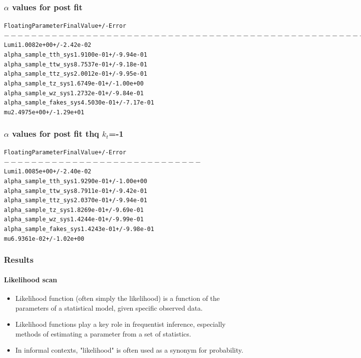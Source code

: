 \documentclass[11pt]{beamer}
\begin{document}
\begin{frame}
\frametitle{$\alpha$ values for post fit}
\begin{alltt}
Floating Parameter		\qquad		FinalValue +/- Error \\
$-----------------------------------------------------------------------$			
Lumi \quad	\qquad	\qquad		\qquad	\qquad	1.0082e+00 +/-  2.42e-02\\
alpha\_sample\_tth\_sys	\quad	1.9100e-01 +/-  9.94e-01\\
alpha\_sample\_ttw\_sys	\quad	8.7537e-01 +/-  9.18e-01\\
alpha\_sample\_ttz\_sys	\quad	2.0012e-01 +/-  9.95e-01\\
alpha\_sample\_tz\_sys\qquad	1.6749e-01 +/-  1.00e+00\\
alpha\_sample\_wz\_sys\qquad	 1.2732e-01 +/-  9.84e-01 \\
alpha\_sample\_fakes\_sys	4.5030e-01 +/-  7.17e-01\\
mu 	\qquad	\qquad	\qquad	\qquad	\qquad	2.4975e+00 +/-  1.29e+01
\end{alltt}
\end{frame}

\begin{frame}
\frametitle{$\alpha$ values for post fit thq $k_t$=-1}
\begin{alltt}
Floating Parameter			\qquad		FinalValue +/- Error \\
$-----------------------------$
Lumi \quad	\qquad	\qquad		\qquad	\qquad 1.0085e+00 +/-  2.40e-02\\
alpha\_sample\_tth\_sys	\quad	1.9290e-01 +/-  1.00e+00 \\
alpha\_sample\_ttw\_sys	\quad	8.7911e-01 +/-  9.42e-01\\
alpha\_sample\_ttz\_sys	\quad	2.0370e-01 +/-  9.94e-01\\
alpha\_sample\_tz\_sys\qquad	1.8269e-01 +/-  9.69e-01\\
alpha\_sample\_wz\_sys\qquad	1.4244e-01 +/-  9.99e-01\\
alpha\_sample\_fakes\_sys	1.4243e-01 +/-  9.98e-01\\
mu \qquad	\qquad	\qquad	\qquad	\qquad 6.9361e-02 +/-  1.02e+00
\end{alltt}
\end{frame}

\begin{frame}
\frametitle{Results}
\framesubtitle{Likelihood scan}
\begin{itemize}
	\item Likelihood function (often simply the likelihood) is a function of the
	parameters of a statistical model, given specific observed data.
	\item Likelihood functions play a key role in frequentist inference,
	especially methods of estimating a parameter from a set of
	statistics.
	\item In informal contexts, "likelihood" is often used as a synonym for
	probability.
\end{itemize}
\end{frame}
\end{document}
